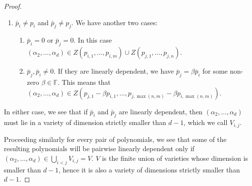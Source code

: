 \documentclass[10pt,a4paper]{amsart}
\newcommand{\F}{\mathbb{F}}
\begin{document}
\begin{proof}
\begin{enumerate}
\begin{enumerate}
				\item
					$ \bar{p}_j \neq 0 $ in which case $ \bar{p}_j = \beta
					\bar{p}_i $ for some non-zero $ \beta \in \F $. Then $
					(\alpha_2, \ldots, \alpha_d) \in Z(p_{j, 1} - \beta p_{i,
					1}, \ldots, p_{j, n} - \beta p_{i, n})$, which is non-empty.
			 \end{enumerate} 

		\item
			$ \bar{p}_i \neq p_i $ and $ \bar{p}_j \neq p_j	$. We have another
			two cases:
			\begin{enumerate}
				\item
					$ \bar{p}_i = 0 $ or $ \bar{p}_j = 0 $. In this case $
					(\alpha_2, \ldots, \alpha_d) \in Z(p_{i,1}, \ldots, p_{i,
					m}) \cup Z(p_{j,1}, \ldots, p_{j, n})$.
				\item 
					$ \bar{p}_j, \bar{p}_i \neq 0$. If they are linearly
					dependent, we have $ \bar{p}_j = \beta \bar{p}_i $ for some
					non-zero $ \beta \in \F $. This means that $ (\alpha_2,
					\ldots, \alpha_d) \in Z(p_{j,1} -\beta p_{i,1}, \ldots,
					p_{j,\max(n,m)} -\beta p_{i,\max(n,m)}) $.
			\end{enumerate}
	\end{enumerate}

	In either case, we see that if $ \bar{p}_i $ and $ \bar{p}_j $ are linearly
	dependent, then $ (\alpha_2, \ldots, \alpha_d) $ must lie in a variety of
	dimension strictly smaller than $ d-1 $, which we call $ V_{i,j} $. 

	Proceeding similarly for every pair of polynomials, we see that some of the
	resulting polynomials will be pairwise linearly dependent only if $
	(\alpha_2, \ldots, \alpha_d) \in \bigcup_{i < j} V_{i,j}  = V$. $ V $ is the
	finite union of varieties whose dimension is smaller than $ d-1 $, hence it
	is also a variety of dimensions strictly smaller than $ d-1 $. 
\end{proof}
\end{document}
